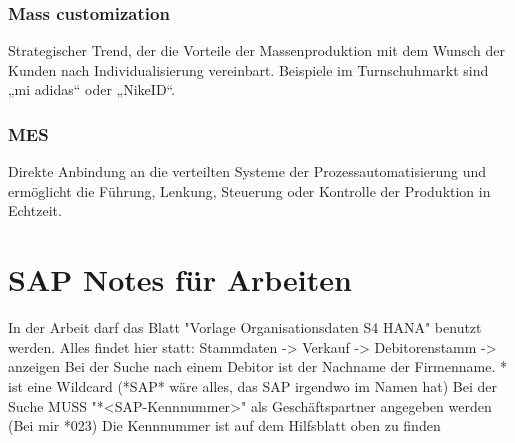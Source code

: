 \documentclass[asp2.tex]{subfiles}
\begin{document}
\subsubsection{Mass customization}

Strategischer Trend, der die Vorteile der Massenproduktion mit dem Wunsch 
der Kunden nach Individualisierung vereinbart. 
Beispiele im Turnschuhmarkt sind  „mi adidas“ oder „NikeID“.  

\subsubsection{MES}

Direkte Anbindung an die verteilten Systeme der Prozessautomatisierung und 
ermöglicht die Führung, Lenkung, Steuerung oder Kontrolle der Produktion in Echtzeit.

\section{SAP Notes für Arbeiten}

\begin{outline}
    \1 In der Arbeit darf das Blatt "Vorlage Organisationsdaten S4 HANA" benutzt werden.
    \1 Alles findet hier statt: Stammdaten -> Verkauf -> Debitorenstamm -> anzeigen
    \1 Bei der Suche nach einem Debitor ist der Nachname der Firmenname.
        \1 * ist eine Wildcard (*SAP* wäre alles, das SAP irgendwo im Namen hat)
        \1 Bei der Suche MUSS "*<SAP-Kennnummer>" als Geschäftspartner angegeben werden (Bei mir *023)
            \1 Die Kennnummer ist auf dem Hilfsblatt oben zu finden
\end{outline}
\end{document}
